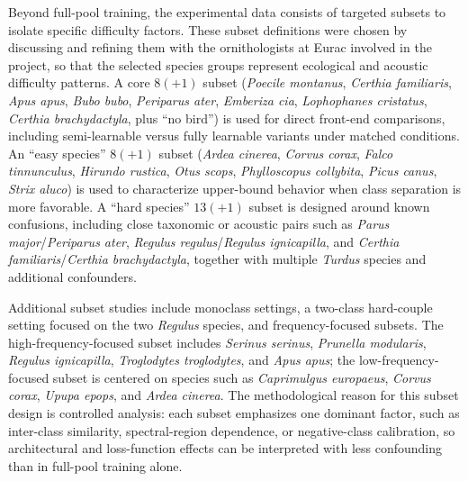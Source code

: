 \documentclass[a4paper,singleside,12pt]{report} %
\begin{document}
	Beyond full-pool training, the experimental data consists of targeted subsets to isolate specific difficulty factors. These subset definitions were chosen by discussing and refining them with the ornithologists at Eurac involved in the project, so that the selected species groups represent ecological and acoustic difficulty patterns. A core \(8(+1)\) subset (\emph{Poecile montanus}, \emph{Certhia familiaris}, \emph{Apus apus}, \emph{Bubo bubo}, \emph{Periparus ater}, \emph{Emberiza cia}, \emph{Lophophanes cristatus}, \emph{Certhia brachydactyla}, plus ``no bird'') is used for direct front-end comparisons, including semi-learnable versus fully learnable variants under matched conditions. An ``easy species'' \(8(+1)\) subset (\emph{Ardea cinerea}, \emph{Corvus corax}, \emph{Falco tinnunculus}, \emph{Hirundo rustica}, \emph{Otus scops}, \emph{Phylloscopus collybita}, \emph{Picus canus}, \emph{Strix aluco}) is used to characterize upper-bound behavior when class separation is more favorable. A ``hard species'' \(13(+1)\) subset is designed around known confusions, including close taxonomic or acoustic pairs such as \emph{Parus major}/\emph{Periparus ater}, \emph{Regulus regulus}/\emph{Regulus ignicapilla}, and \emph{Certhia familiaris}/\emph{Certhia brachydactyla}, together with multiple \emph{Turdus} species and additional confounders.

	Additional subset studies include monoclass settings, a two-class hard-couple setting focused on the two \emph{Regulus} species, and frequency-focused subsets. The high-frequency-focused subset includes \emph{Serinus serinus}, \emph{Prunella modularis}, \emph{Regulus ignicapilla}, \emph{Troglodytes troglodytes}, and \emph{Apus apus}; the low-frequency-focused subset is centered on species such as \emph{Caprimulgus europaeus}, \emph{Corvus corax}, \emph{Upupa epops}, and \emph{Ardea cinerea}. The methodological reason for this subset design is controlled analysis: each subset emphasizes one dominant factor, such as inter-class similarity, spectral-region dependence, or negative-class calibration, so architectural and loss-function effects can be interpreted with less confounding than in full-pool training alone.
\end{document}
